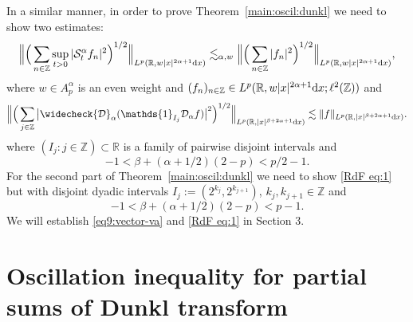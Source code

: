 \documentclass[11pt,oneside]{amsart}
\numberwithin{equation}{section}
\theoremstyle{definition}
\newcommand{\RR}{\mathbb{R}}
\newcommand{\ZZ}{\mathbb{Z}}
\newcommand{\calS}{\mathcal{S}}
\newcommand{\calD}{\mathcal{D}}
\begin{document}
In a similar manner, in order to prove Theorem~\ref{main:oscil:dunkl} we need to show two estimates:
\begin{equation}\label{eq9:vector-va}
    \Big\|\Big(\sum_{n\in\ZZ}\sup_{t>0} |\calS_{t}^\alpha f_n|^2\Big)^{1/2}\Big\|_{L^p(\RR,w|x|^{2\alpha+1}{\rm d}x)}\lesssim_{\alpha,w}\Big\|\Big(\sum_{n\in\ZZ}|f_n|^2\Big)^{1/2}\Big\|_{L^p(\RR,w|x|^{2\alpha+1}{\rm d}x)},
\end{equation}
where $w\in A_p^\alpha$ is an even weight and $(f_n)_{n\in\ZZ}\in L^p(\RR, w|x|^{2\alpha+1}{\rm d}x;\ell^2(\ZZ))$ and
\begin{equation}\label{RdF eq:1}
\Big\|\Big(\sum_{j\in\ZZ}\big|\widecheck{\calD}_\alpha(\mathds{1}_{I_j} \calD_\alpha f)\big|^2\Big)^{1/2}\Big\|_{L^p(\RR,|x|^{\beta+2\alpha+1}{\rm d}x)}\lesssim\|f\|_{L^p(\RR,|x|^{\beta+2\alpha+1}{\rm d}x)}.
\end{equation}
where $(I_j:j\in\ZZ)\subset\RR$ is a family of pairwise disjoint intervals and 
\begin{equation*}
    -1<\beta+(\alpha+1/2)(2-p)<p/2-1.
\end{equation*}
For the second part of Theorem~\ref{main:oscil:dunkl} we need to show \eqref{RdF eq:1} but with disjoint dyadic intervals $I_j:=(2^{k_j},2^{k_{j+1}})$, $k_j,k_{j+1}\in\ZZ$ and
\begin{equation*}
    -1<\beta+(\alpha+1/2)(2-p)<p-1.
\end{equation*}
We will establish \eqref{eq9:vector-va} and \eqref{RdF eq:1} in Section 3.


\section{Oscillation inequality for partial sums of Dunkl transform}
\end{document}
